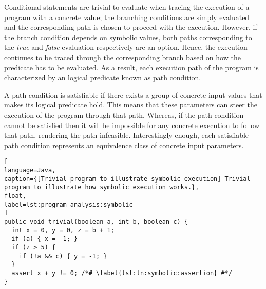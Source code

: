 Conditional statements are trivial to evaluate when tracing the execution of a program with a concrete value; the branching conditions are simply evaluated and the corresponding path is chosen to proceed with the execution. However, if the branch condition depends on symbolic values, both paths corresponding to the \textit{true} and \textit{false} evaluation respectively are an option. Hence, the execution continues to be traced through the corresponding branch based on how the predicate has to be evaluated. As a result, each execution path of the program is characterized by an logical predicate known as path condition.

A path condition is satisfiable if there exists a group of concrete input values that makes its logical predicate hold. This means that these parameters can steer the execution of the program through that path. Whereas, if the path condition cannot be satisfied then it will be impossible for any concrete execution to follow that path, rendering the path infeasible. Interestingly enough, each satisfiable path condition represents an equivalence class of concrete input parameters.  %

\begin{lstlisting}[
language=Java,
caption={[Trivial program to illustrate symbolic execution] Trivial program to illustrate how symbolic execution works.},
float,
label=lst:program-analysis:symbolic
]
public void trivial(boolean a, int b, boolean c) {
  int x = 0, y = 0, z = b + 1;
  if (a) { x = -1; }
  if (z > 5) {
    if (!a && c) { y = -1; }
  }
  assert x + y != 0; /*# \label{lst:ln:symbolic:assertion} #*/
}
\end{lstlisting}



